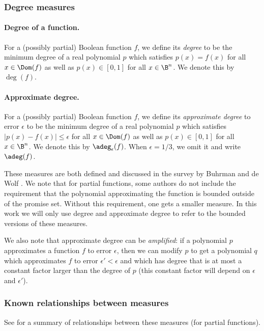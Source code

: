 \subsubsection{Degree measures}

\paragraph{Degree of a function.} For a
(possibly partial) Boolean function $f$, we define
its \emph{degree} to be the minimum degree of a real
polynomial $p$ which satisfies $p(x)=f(x)$
for all $x\in\Dom(f)$ as well as $p(x)\in[0,1]$ for
all $x\in\B^n$. We denote this by $\deg(f)$.

\paragraph{Approximate degree.} For a (possibly partial)
Boolean function $f$, we define its \emph{approximate degree}
to error $\epsilon$
to be the minimum degree of a real polynomial $p$
which satisfies $|p(x)-f(x)|\le \epsilon$
for all $x\in\Dom(f)$
as well as $p(x)\in[0,1]$ for all $x\in\B^n$.
We denote this by $\adeg_\epsilon(f)$.
When $\epsilon=1/3$, we omit it and write $\adeg(f)$.

These measures are both defined and discussed in the
survey by Buhrman and de Wolf \cite{BdW02}.
We note that for partial functions, some authors do not
include the requirement that the polynomial approximating
the function is bounded outside of the promise set.
Without this requirement, one gets a smaller measure.
In this work we will only use degree and approximate
degree to refer to the bounded versions of these measures.

We also note that approximate degree can be \emph{amplified}:
if a polynomial $p$ approximates a function $f$ to error
$\epsilon$, then we can modify $p$ to get a polynomial $q$
which approximates $f$ to error $\epsilon'<\epsilon$
and which has degree that is at most a constant factor
larger than the degree of $p$ (this constant
factor will depend on $\epsilon$ and $\epsilon'$).

\subsubsection{Known relationships between measures}

See  for a summary of relationships
between these measures (for partial functions).


